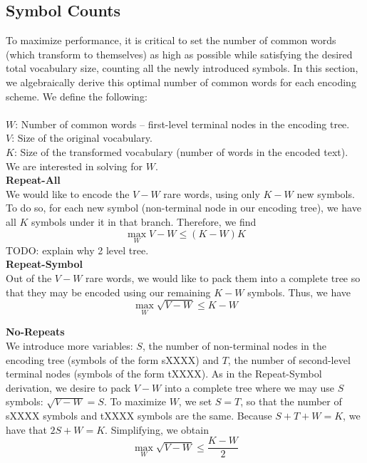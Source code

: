 \subsection{Symbol Counts}
To maximize performance, it is critical to set the number of common words (which
transform to themselves) as high as possible while satisfying the desired total vocabulary size,
counting all the newly introduced symbols. In this section, we algebraically derive
this optimal number of common words for each encoding scheme. We define the following:\\\\
$W$: Number of common words -- first-level terminal nodes in the encoding tree.\\
$V$: Size of the original vocabulary.\\
$K$: Size of the transformed vocabulary (number of words in the encoded text).\\

We are interested in solving for $W$.\\

\textbf{Repeat-All}\\
We would like to encode the $V - W$ rare words, using only $K - W$ new symbols. To do so,
for each new symbol (non-terminal node in our encoding tree), we have all $K$ symbols under
it in that branch. Therefore, we find $$\max_{W} V - W \leq (K - W)K$$
TODO: explain why 2 level tree.\\

\textbf{Repeat-Symbol}\\
Out of the $V - W$ rare words, we would like to pack them into a complete tree so that
they may be encoded using our remaining $K - W$ symbols. Thus, we have $$\max_{W} \sqrt{V - W} \leq K - W$$

\textbf{No-Repeats}\\
We introduce more variables: $S$, the number of non-terminal nodes in the encoding tree (symbols
of the form sXXXX) and $T$, the number of second-level terminal nodes (symbols of the form tXXXX).
As in the Repeat-Symbol derivation, we desire to pack $V - W$ into a complete tree where we
may use $S$ symbols: $\sqrt{V - W} = S$. To maximize $W$, we set $S = T$, so that the number of sXXXX symbols and tXXXX
symbols are the same. Because $S + T + W = K$, we have that $2S + W = K$. Simplifying, we obtain
$$\max_{W} \sqrt{V - W} \leq \dfrac{K - W}{2}$$
